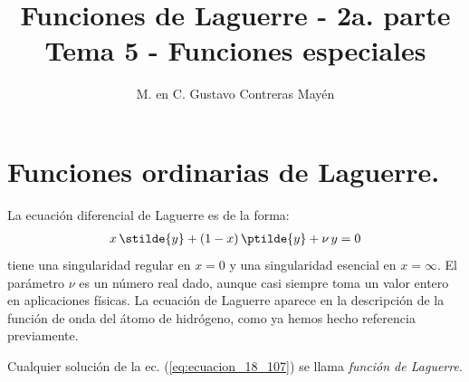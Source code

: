
\usepackage{apacite}
\title{Funciones de Laguerre - 2a. parte \\ \large {Tema 5 - Funciones especiales} \vspace{-3ex}}
\author{M. en C. Gustavo Contreras Mayén}
\date{ }

\vspace{-4cm}
\maketitle
\fontsize{14}{14}\selectfont
\tableofcontents
\newpage
\section{Funciones ordinarias de Laguerre.}\label{sec:seccion_01}
La ecuación diferencial de Laguerre es de la forma:
\begin{align}
x \, \stilde{y} + (1 - x) \, \ptilde{y} + \nu \, y = 0
\label{eq:ecuacion_18_107}
\end{align}
tiene una singularidad regular en $x = 0$ y una singularidad esencial en $x = \infty$. El parámetro $\nu$ es un número real dado, aunque casi siempre toma un valor entero en aplicaciones físicas. La ecuación de Laguerre aparece en la descripción de la función de onda del átomo de hidrógeno, como ya hemos hecho referencia previamente.
\par
Cualquier solución de la ec. (\ref{eq:ecuacion_18_107}) se llama \emph{función de Laguerre}. 
